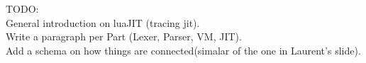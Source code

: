 TODO:\\
General introduction on luaJIT (tracing jit).\\
Write a paragraph per Part (Lexer, Parser, VM, JIT).\\
Add a schema on how things are connected(simalar of the one in  Laurent's slide).
